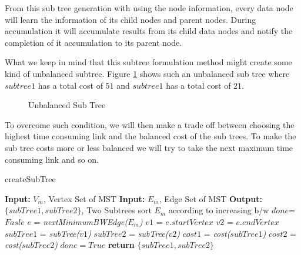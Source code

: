 \documentclass[10pt,conference,letterpaper]{IEEEtran}
\begin{document}
From this sub tree generation with using the node information, every data node will learn the information of its child nodes and parent nodes. During accumulation it will accumulate results from its child data nodes and notify the completion of it accumulation to its parent node.  

What we keep in mind that this  subtree formulation method might create some kind of unbalanced subtree. Figure \ref{uMST} shows such an unbalanced sub tree where $subtree1$ has a total cost of $51$ and $subtree1$ has a total cost of $21$.

\begin{figure}[!htbp]
\label{uMST}
\centering
{}
\caption{Unbalanced Sub Tree}
\end{figure}

To overcome such condition, we will then make a trade off between choosing the highest time consuming link and the balanced cost of the sub trees. To make the sub tree costs more or less balanced we will try to take the next maximum time consuming link and so on. 

\begin{algorithm} [!htbp]
\label{algo6}
	\caption{createSubTree}
	\begin{algorithmic}[1]
		\State \textbf{Input: }$V_m$, Vertex Set of MST
		\State \textbf{Input:}	$E_m$, Edge Set of MST
		\State \textbf{Output: }$\{subTree1, subTree2\}$, Two Subtrees
		\State sort $E_m$ according to increasing b/w
		\State $done$=$Fasle$
			\State $e$ = \textit{nextMinimumBWEdge($E_m$)}
			\State $v1$ = $e.startVertex$
			\State $v2$ = $e.endVertex$
			\State $subTree1$ = \textit{subTree($v1$)}
			\State $subTree2$ = \textit{subTree($v2$)}
			\State $cost1$ = \textit{cost($subTree1$)}
			\State $cost2$ = \textit{cost($subTree2$)}
				\State $done = True$
			\EndIf
		\EndWhile	
		\State \textbf{return} $\{subTree1, subTree2\}$
	\end{algorithmic}
\end{algorithm}
\end{document}
